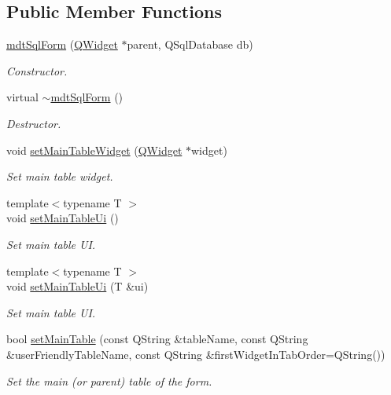 \subsection*{Public Member Functions}
\begin{DoxyCompactItemize}
\item 
\hyperlink{classmdt_sql_form_a607993f0d35207668c0f220d77bd9298}{mdt\-Sql\-Form} (\hyperlink{class_q_widget}{Q\-Widget} $\ast$parent, Q\-Sql\-Database db)
\begin{DoxyCompactList}\small\item\em Constructor. \end{DoxyCompactList}\item 
virtual \hyperlink{classmdt_sql_form_ab4538979323566433a20bb71118525a5}{$\sim$mdt\-Sql\-Form} ()
\begin{DoxyCompactList}\small\item\em Destructor. \end{DoxyCompactList}\item 
void \hyperlink{classmdt_sql_form_ab1fee5cecde1e2faf4b4c1bf1ee672b1}{set\-Main\-Table\-Widget} (\hyperlink{class_q_widget}{Q\-Widget} $\ast$widget)
\begin{DoxyCompactList}\small\item\em Set main table widget. \end{DoxyCompactList}\item 
{\footnotesize template$<$typename T $>$ }\\void \hyperlink{classmdt_sql_form_ae3651d94b995dc84665f934ba9c7458f}{set\-Main\-Table\-Ui} ()
\begin{DoxyCompactList}\small\item\em Set main table U\-I. \end{DoxyCompactList}\item 
{\footnotesize template$<$typename T $>$ }\\void \hyperlink{classmdt_sql_form_ab4e3d6512a68eba681be79d1602b6d44}{set\-Main\-Table\-Ui} (T \&ui)
\begin{DoxyCompactList}\small\item\em Set main table U\-I. \end{DoxyCompactList}\item 
bool \hyperlink{classmdt_sql_form_abe4cc1a317d8e76aed7b408184c8712e}{set\-Main\-Table} (const Q\-String \&table\-Name, const Q\-String \&user\-Friendly\-Table\-Name, const Q\-String \&first\-Widget\-In\-Tab\-Order=Q\-String())
\begin{DoxyCompactList}\small\item\em Set the main (or parent) table of the form. \end{DoxyCompactList}\item 

\end{DoxyCompactItemize}
